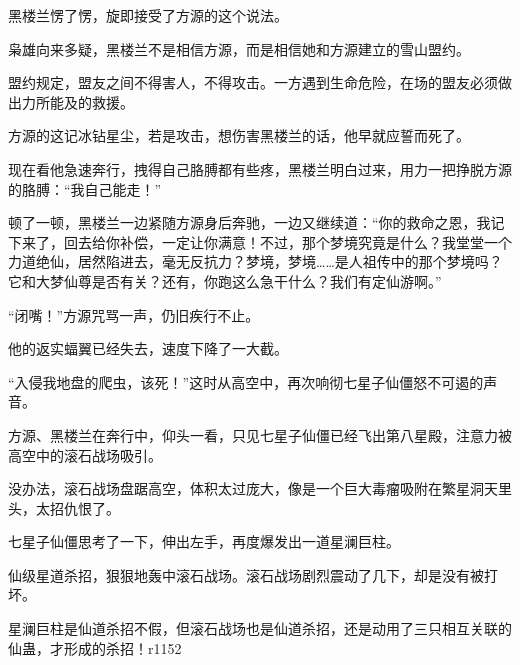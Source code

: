 \begin{this_body}
黑楼兰愣了愣，旋即接受了方源的这个说法。

枭雄向来多疑，黑楼兰不是相信方源，而是相信她和方源建立的雪山盟约。

盟约规定，盟友之间不得害人，不得攻击。一方遇到生命危险，在场的盟友必须做出力所能及的救援。

方源的这记冰钻星尘，若是攻击，想伤害黑楼兰的话，他早就应誓而死了。

现在看他急速奔行，拽得自己胳膊都有些疼，黑楼兰明白过来，用力一把挣脱方源的胳膊：“我自己能走！”

顿了一顿，黑楼兰一边紧随方源身后奔驰，一边又继续道：“你的救命之恩，我记下来了，回去给你补偿，一定让你满意！不过，那个梦境究竟是什么？我堂堂一个力道绝仙，居然陷进去，毫无反抗力？梦境，梦境……是人祖传中的那个梦境吗？它和大梦仙尊是否有关？还有，你跑这么急干什么？我们有定仙游啊。”

“闭嘴！”方源咒骂一声，仍旧疾行不止。

他的返实蝠翼已经失去，速度下降了一大截。

“入侵我地盘的爬虫，该死！”这时从高空中，再次响彻七星子仙僵怒不可遏的声音。

方源、黑楼兰在奔行中，仰头一看，只见七星子仙僵已经飞出第八星殿，注意力被高空中的滚石战场吸引。

没办法，滚石战场盘踞高空，体积太过庞大，像是一个巨大毒瘤吸附在繁星洞天里头，太招仇恨了。

七星子仙僵思考了一下，伸出左手，再度爆发出一道星澜巨柱。

仙级星道杀招，狠狠地轰中滚石战场。滚石战场剧烈震动了几下，却是没有被打坏。

星澜巨柱是仙道杀招不假，但滚石战场也是仙道杀招，还是动用了三只相互关联的仙蛊，才形成的杀招！r1152

\end{this_body}

